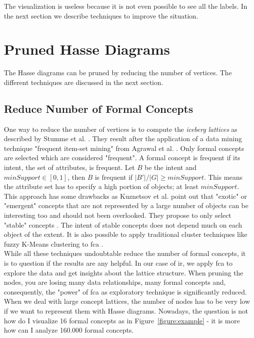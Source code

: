 \documentclass[11pt]{report}
\begin{document}
The visualization is useless because it is not even possible to see all the labels. In the next section we describe techniques to improve the situation.

\section{Pruned Hasse Diagrams}

The Hasse diagrams can be pruned by reducing the number of vertices. The different techniques are discussed in the next section.

\subsection{Reduce Number of Formal Concepts}

One way to reduce the number of vertices is to compute the \textit{iceberg lattices} as described by Stumme et al. \cite{Stumme2002}. They result after the application of a data mining technique "frequent item-set mining" from Agrawal et al. \cite{Agrawal1993}. Only formal concepts are selected which are considered "frequent". A formal concept is frequent if its intent, the set of attributes, is frequent. Let $B$ be the intent and $minSupport \in [0, 1]$, then $B$ is frequent if $ |B'|/|G| \geq minSupport$. This means the attribute set has to specify a high portion of objects; at least $minSupport$. This approach has some drawbacks as Kuznetsov et al. \cite{Kuznetsov20072} point out that "exotic" or "emergent" concepts that are not represented by a large number of objects can be interesting too and should not been overlooked. They propose to only select "stable" concepts \cite{Kuznetsov20072}. The intent of stable concepts does not depend much on each object of the extent. It is also possible to apply traditional cluster techniques like fuzzy K-Means clustering to \acrshort{fca} \cite{AswaniKumar2010}. \\

	While all these techniques undoubtable reduce the number of formal concepts, it is to question if the results are any helpful. In our case of \acrshort{ir}, we apply \acrshort{fca} to explore the data and get insights about the lattice structure. When pruning the nodes, you are losing many data relationships, many formal concepts and, consequently, the "power" of \acrshort{fca} as exploratory technique is significantly reduced. When we deal with large concept lattices, the number of nodes has to be very low if we want to represent them with Hasse diagrams. Nowadays, the question is not how do I visualize 16 formal concepts as in Figure~\ref{figure:example} - it is more how can I analyze 160.000 formal concepts.\\
	
\end{document}
